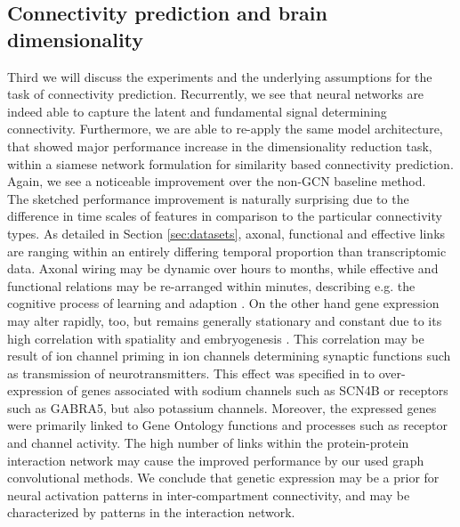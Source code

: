 \documentclass[]{article}
\renewcommand{\cite}{\citep}
\begin{document}
\subsection{Connectivity prediction and brain dimensionality}
\label{sec:disc_connpred}
Third we will discuss the experiments and the underlying assumptions for the task of connectivity prediction.
Recurrently, we see that neural networks are indeed able to capture the latent and fundamental signal determining connectivity. Furthermore, we are able to re-apply the same model architecture, that showed major performance increase in the dimensionality reduction task, within a siamese network formulation for similarity based connectivity prediction. Again, we see a noticeable improvement over the non-GCN baseline method.\\

The sketched performance improvement is naturally surprising due to the difference in time scales of features in comparison to the particular connectivity types. As detailed in Section \ref{sec:datasets}, axonal, functional and effective links are ranging within an entirely differing temporal proportion than transcriptomic data. Axonal wiring may be dynamic over hours to months, while effective and functional relations may be re-arranged within minutes, describing e.g. the cognitive process of learning and adaption \cite{van2010exploring, friston1994functional, friston1993functional, sporns2016networks}. On the other hand gene expression may alter rapidly, too, but remains generally stationary and constant due to its high correlation with spatiality \cite{Partel2020, bohland2010clustering} and embryogenesis \cite{zapala2005adult, dillman2013mrna}. This correlation may be result of ion channel priming in ion channels determining synaptic functions such as transmission of neurotransmitters. This effect was specified in \citet{richiardi2015correlated} to over-expression of genes associated with sodium channels such as SCN4B or receptors such as GABRA5, but also potassium channels. Moreover, the expressed genes were primarily linked to Gene Ontology functions and processes \cite{GOoriginal2000, GOrecent2020} such as receptor and channel activity. The high number of links within the protein-protein interaction network may cause the improved performance by our used graph convolutional methods. We conclude that genetic expression may be a prior for neural activation patterns in inter-compartment connectivity, and may be characterized by patterns in the interaction network.\\
\end{document}
